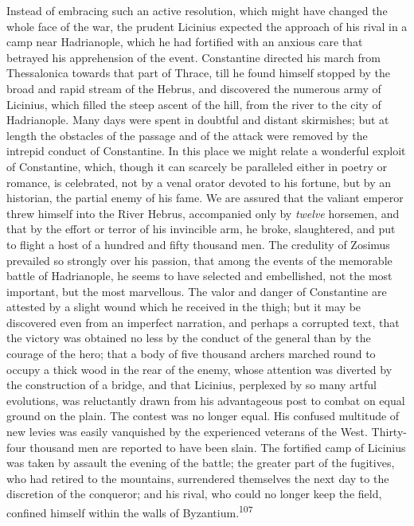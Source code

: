 Instead of embracing such an active resolution, which might have
changed the whole face of the war, the prudent Licinius expected
the approach of his rival in a camp near Hadrianople, which he
had fortified with an anxious care that betrayed his apprehension
of the event. Constantine directed his march from Thessalonica
towards that part of Thrace, till he found himself stopped by the
broad and rapid stream of the Hebrus, and discovered the numerous
army of Licinius, which filled the steep ascent of the hill, from
the river to the city of Hadrianople. Many days were spent in
doubtful and distant skirmishes; but at length the obstacles of
the passage and of the attack were removed by the intrepid
conduct of Constantine. In this place we might relate a wonderful
exploit of Constantine, which, though it can scarcely be
paralleled either in poetry or romance, is celebrated, not by a
venal orator devoted to his fortune, but by an historian, the
partial enemy of his fame. We are assured that the valiant
emperor threw himself into the River Hebrus, accompanied only by
\textit{twelve} horsemen, and that by the effort or terror of his
invincible arm, he broke, slaughtered, and put to flight a host
of a hundred and fifty thousand men. The credulity of Zosimus
prevailed so strongly over his passion, that among the events of
the memorable battle of Hadrianople, he seems to have selected
and embellished, not the most important, but the most marvellous.
The valor and danger of Constantine are attested by a slight
wound which he received in the thigh; but it may be discovered
even from an imperfect narration, and perhaps a corrupted text,
that the victory was obtained no less by the conduct of the
general than by the courage of the hero; that a body of five
thousand archers marched round to occupy a thick wood in the rear
of the enemy, whose attention was diverted by the construction of
a bridge, and that Licinius, perplexed by so many artful
evolutions, was reluctantly drawn from his advantageous post to
combat on equal ground on the plain. The contest was no longer
equal. His confused multitude of new levies was easily vanquished
by the experienced veterans of the West. Thirty-four thousand men
are reported to have been slain. The fortified camp of Licinius
was taken by assault the evening of the battle; the greater part
of the fugitives, who had retired to the mountains, surrendered
themselves the next day to the discretion of the conqueror; and
his rival, who could no longer keep the field, confined himself
within the walls of Byzantium.\textsuperscript{107}


